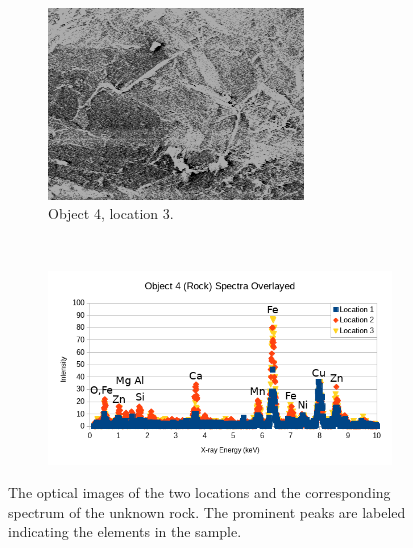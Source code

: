 \documentclass[10pt]{IEEEtran}
\begin{document}
\begin{center}
\begin{figure}[!hbt]
    ~ %
    \begin{subfigure}[!hbt]{0.19\textwidth}
        \includegraphics[width=\textwidth]{Object4_3}
        \caption{Object 4, location 3.}
        \label{fig:Object4_3}
    \end{subfigure}\hfill
    ~ %
    \begin{subfigure}[!hbt]{0.40\textwidth}
        \includegraphics[width=\textwidth]{Object4}
        \label{fig:Object4}
    \end{subfigure}
    \caption{The optical images of the two locations and the corresponding spectrum of the unknown rock. The prominent peaks are labeled indicating the elements in the sample.}
    \label{fig:objects4}
\end{figure}
\end{center}
\end{document}
